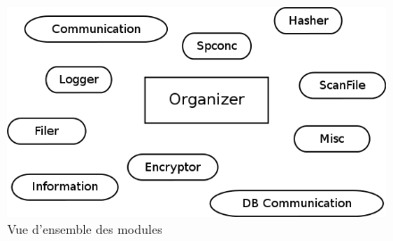 \documentclass[a4paper,10pt, twoside]{report}
\begin{document}
\begin{spacing}{1.2}
\begin{figure}[h!]
  \centering
  \includegraphics[scale=0.51]{softwareDesign/overviewModule.png}
  \caption{\label{overviewModule} Vue d'ensemble des modules}
\end{figure}


\end{spacing}
\end{document}
